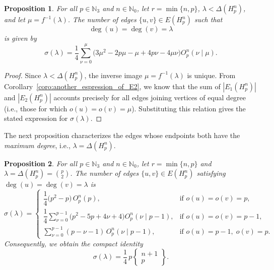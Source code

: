 \documentclass[letterpaper,12pt]{article}
\newtheorem{proposition}{Proposition}
\begin{document}
\begin{proposition}\label{prop:eqdeg-lower}
For all $p \in \mathbb{N}_3$ and $n \in \mathbb{N}_0$,  let $r = \min\{n, p\}$,  $\lambda < \Delta(H_p^n)$, and let $\mu=f^{-1}(\lambda)$.
The number of edges $\{u,v\}\in E(H_p^n)$ such that
\[
\deg(u)=\deg(v)=\lambda
\]
is given by
\begin{equation}
    \sigma(\lambda)
    = \dfrac{1}{4}   \sum_{\nu = 0}^{\mu} 
       \bigl( 3\mu^{2} - 2p\mu - \mu + 4p\nu - 4\mu\nu \bigr)
       O_p^n(\nu \mid \mu).
\end{equation}
\end{proposition}

\begin{proof}
Since $\lambda < \Delta(H_p^n)$, the inverse image $\mu=f^{-1}(\lambda)$ is unique.  
From Corollary~\ref{coro:another_espression_of_E2}, we know that the sum of $|E_1(H_p^n)|$ and $|E_2(H_p^n)|$ accounts precisely for all edges joining vertices of equal degree (i.e., those for which $o(u)=o(v)=\mu$).  
Substituting this relation gives the stated expression for $\sigma(\lambda)$.
\end{proof}


\noindent
The next proposition characterizes the edges whose endpoints both have the \emph{maximum degree}, i.e., $\lambda=\Delta(H_p^n)$.

\begin{proposition}\label{prop:eqdeg-top}  
For all $p \in \mathbb{N}_3$ and $n \in \mathbb{N}_0$,  let $r = \min\{n, p\}$ and  $\lambda=\Delta(H_p^n)=\binom{p}{2}$.
The number of edges $\{u,v\}\in E(H_p^n)$ satisfying $\deg(u)=\deg(v)=\lambda$ is
\begin{equation}\label{eq:sigma-top}
         \sigma(\lambda)=\begin{cases}
             \dfrac{1}{4}  \bigl(p^{2} -p\bigr)\, O_p^n(p), & \text{if } o(u)=o(v)=p,\\[4pt]
             \dfrac{1}{4}   \displaystyle\sum_{\nu = 0}^{p-1} 
             \bigl(p^{2}-5p+4\nu+4\bigr) O_p^n(\nu \mid p-1),
             & \text{if } o(u)=o(v)=p-1,\\[8pt]
             \displaystyle\sum_{\nu = 0}^{p-1}  (p-\nu-1)\, O_p^n(\nu \mid p-1),
             & \text{if } o(u)=p-1,\; o(v)=p.
         \end{cases}
\end{equation}
Consequently, we obtain the compact identity
\begin{equation}
        \sigma(\lambda)
        = \dfrac{1}{4}\,p
          \begin{Bmatrix}
             n+1\\p
          \end{Bmatrix}.
\end{equation}
\end{proposition}
\end{document}
